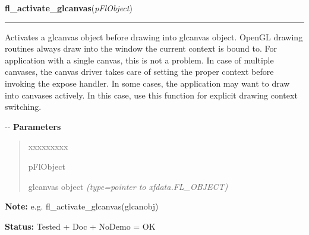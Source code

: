 \hspace{.8\funcindent}\begin{boxedminipage}{\funcwidth}

    \raggedright \textbf{fl\_activate\_glcanvas}(\textit{pFlObject})

    \vspace{-1.5ex}

    \rule{\textwidth}{0.5\fboxrule}
\setlength{\parskip}{2ex}

Activates a glcanvas object before drawing into glcanvas object. OpenGL
drawing routines always draw into the window the current context is bound
to. For application with a single canvas, this is not a problem. In case
of multiple canvases, the canvas driver takes care of setting the proper
context before invoking the expose handler. In some cases, the
application may want to draw into canvases actively. In this case, use
this function for explicit drawing context switching.

-{}-
\setlength{\parskip}{1ex}
      \textbf{Parameters}
      \vspace{-1ex}

      \begin{quote}
        \begin{Ventry}{xxxxxxxxx}

          \item[pFlObject]


glcanvas object
            {\it (type=pointer to xfdata.FL\_OBJECT)}

        \end{Ventry}

      \end{quote}

\textbf{Note:} 
e.g. fl\_activate\_glcanvas(glcanobj)


\textbf{Status:} 
Tested + Doc + NoDemo = OK


    \end{boxedminipage}

    \label{xformslib:flglcanvas:fl_get_glcanvas_xvisualinfo}

    \vspace{0.5ex}

